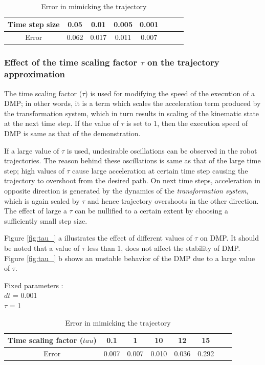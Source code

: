 \begin{center}
	\begin{table}[H]
		\centering
		\begin{tabular}{| c | c | c | c | c | c | c | c |}	
			\hline
			Time step size & 0.05 & 0.01 & 0.005 & 0.001 \\       
			\hline
			Error & 0.062 & 0.017 & 0.011 & 0.007 \\
			\hline
		\end{tabular}
		\caption{Error in mimicking the trajectory}
	\end{table}\label{_dt_e}
\end{center}


\subsubsection{Effect of the time scaling factor $\tau$ on the trajectory approximation}   

The time scaling factor ($\tau$) is used for modifying the speed of the execution of a DMP; in other words, it is a term which scales the acceleration term produced by the transformation system, which in turn results in scaling of the kinematic state at the next time step. If the value of $\tau$ is set to $1$, then the execution speed of DMP is same as that of the demonstration. 

If a large value of $\tau$ is used, undesirable oscillations can be observed in the robot trajectories. The reason behind these oscillations is same as that of the large time step; high values of $\tau$ cause large acceleration at certain time step causing the trajectory to overshoot from the desired path. On next time steps, acceleration in opposite direction is generated by the dynamics of the \textit{transformation system}, which is again scaled by $\tau$ and hence trajectory overshoots in the other direction. The effect of large a $\tau$ can be nullified to a certain extent by choosing a sufficiently small step size. 


Figure \ref{fig:tau_} a illustrates the effect of different values of $\tau$ on DMP. It should be noted that a value of $\tau$ less than 1, does not affect the stability of DMP. Figure \ref{fig:tau_} b shows an unstable behavior of the DMP due to a large value of $\tau$.

Fixed parameters : \\
$dt$ = 0.001 \\
$\tau$ = 1 


\begin{center}
	\begin{table}[H]
		\centering
		\begin{tabular}{| c | c | c | c | c | c | c | c |}	
			\hline
			Time scaling factor ($tau$) & 0.1 & 1 & 10 & 12 & 15 \\       
			\hline
			Error & 0.007 & 0.007 & 0.010 & 0.036 & 0.292   \\
			\hline
		\end{tabular}
		\caption{Error in mimicking the trajectory}
	\end{table}\label{_tau_e}
\end{center}

